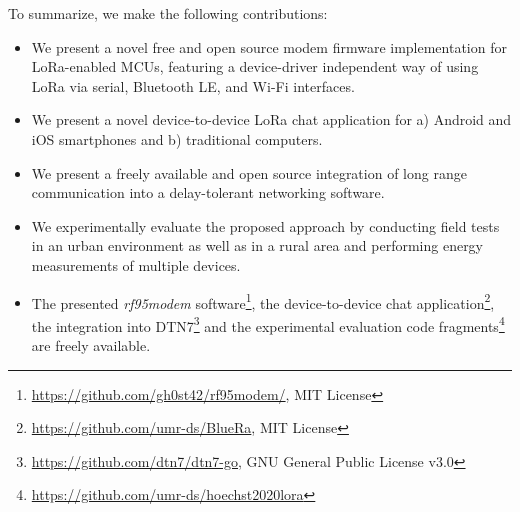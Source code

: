 To summarize, we make the following contributions:
\begin{itemize}
    \item We present a novel free and open source modem firmware implementation for LoRa-enabled MCUs, featuring a device-driver independent way of using LoRa via serial, Bluetooth LE, and Wi-Fi interfaces.
    \item We present a novel device-to-device LoRa chat application for a) Android and iOS smartphones and b) traditional computers.
    \item We present a freely available and open source integration of long range communication into a delay-tolerant networking software.
    \item We experimentally evaluate the proposed approach by conducting field tests in an urban environment as well as in a rural area and performing energy measurements of multiple devices.
    \item The presented \textit{rf95modem} software\footnote{\url{https://github.com/gh0st42/rf95modem/}, MIT License}, 
    the device-to-device chat application\footnote{\url{https://github.com/umr-ds/BlueRa}, MIT License}, 
    the integration into DTN7\footnote{\url{https://github.com/dtn7/dtn7-go}, GNU General Public License v3.0} and 
    the experimental evaluation code fragments\footnote{\url{https://github.com/umr-ds/hoechst2020lora}} 
    are freely available.
\end{itemize}

